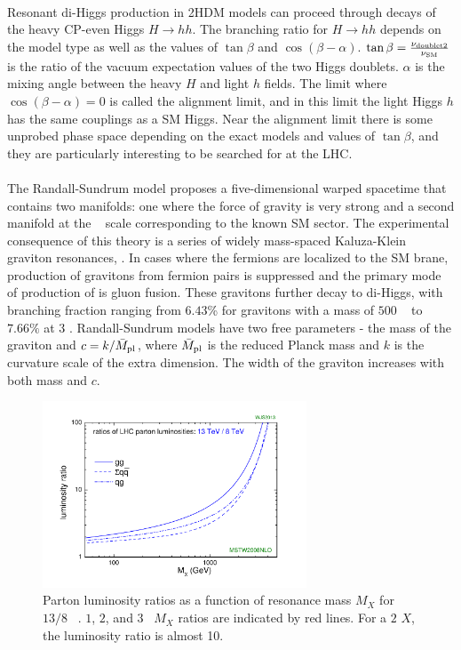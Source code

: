 \paragraph{}
Resonant di-Higgs production in 2HDM models can proceed through decays of the heavy CP-even Higgs $H\to hh$. 
The branching ratio for $H\to hh$ depends on the model type as well as the values of $\tan{\beta}$ and $\cos(\beta - \alpha)$. 
$\tan{\beta} = \frac{\rm \nu_{\rm doublet2}}{\rm \nu_{SM}}$ is the ratio of the vacuum expectation values of the two Higgs doublets. 
$\alpha$ is the mixing angle between the heavy $H$ and light $h$ fields. 
The limit where $\cos(\beta - \alpha) = 0$ is called the alignment limit, and in this limit the light Higgs $h$ has the same couplings as a SM Higgs. 
Near the alignment limit there is some unprobed phase space depending on the exact models and values of $\tan{\beta}$, and they are particularly interesting to be searched for at the LHC.

\paragraph{}
The Randall-Sundrum model proposes a five-dimensional warped spacetime that contains two manifolds: one where the force of gravity is very strong and a second manifold at the \TeV~ scale corresponding to the known SM sector.
The experimental consequence of this theory is a series of widely mass-spaced Kaluza-Klein graviton resonances, \Grav. 
In cases where the fermions are localized to the SM brane, production of gravitons from fermion pairs is suppressed and the primary mode of production of \Grav is gluon fusion. 
These gravitons further decay to di-Higgs, with branching fraction ranging from $6.43$\% for gravitons with a mass of $500$ \GeV~ to $7.66\%$ at $3$ \TeV.
Randall-Sundrum models have two free parameters - the mass of the graviton and $c = k/\bar{M}_{\rm pl}$, where $\bar{M}_{\rm pl}$ is the reduced Planck mass and $k$ is the curvature scale of the extra dimension. 
The width of the graviton increases with both mass and $c$.

\begin{figure}[h!]
  \centering
  \captionsetup{justification=centering}
  \includegraphics[width=0.7\textwidth]{figures/theory/lhclumi7813_2013_v1}
  \caption{Parton luminosity ratios as a function of resonance mass $M_{X}$ for $13/8$ \TeV~\cite{LumiRatio}. $1$, $2$, and $3$ ~\TeV $M_{X}$ ratios are indicated by red lines. For a $2$ \TeV $X$, the luminosity ratio is almost 10.}
  \label{fig:lumi_ratio}
\end{figure}

